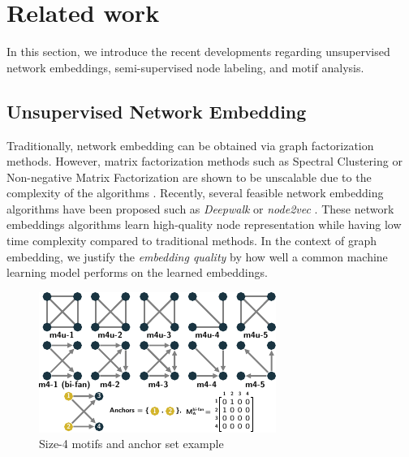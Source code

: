 \documentclass{article}
\theoremstyle{definition}
\begin{document}
\section{Related work}

In this section, we introduce the recent developments regarding unsupervised 
network embeddings, semi-supervised node labeling, and motif analysis.

\subsection{Unsupervised Network Embedding}

Traditionally, network embedding can be obtained via graph 
factorization methods. However, matrix factorization methods such as
Spectral Clustering or Non-negative Matrix Factorization are 
shown to be unscalable due to the complexity of the algorithms 
\cite{deepwalk,eigmaps}. Recently, several feasible network
embedding algorithms have been proposed such as \emph{Deepwalk}
\cite{deepwalk} or \emph{node2vec} \cite{node2vec}. These network embeddings 
algorithms learn high-quality node representation while having low time
complexity compared to traditional methods. In the context of graph embedding, we 
justify the \emph{embedding quality} by how well a common machine learning model 
performs on the learned embeddings. 

\begin{figure}[H]
    \centering
    \includegraphics[width=0.8\linewidth]{m4}
    \caption{Size-4 motifs and anchor set example}
    \label{fig:m4}
\end{figure}
\end{document}
